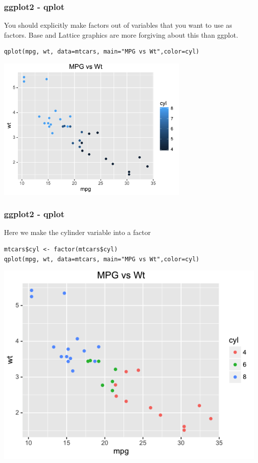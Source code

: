 \documentclass{beamer}
\begin{document}
%

\begin{frame}[fragile]
\frametitle{ggplot2 - qplot}
You should explicitly make factors out of variables that you want to use as factors. Base and Lattice graphics are more forgiving about this than ggplot.
\scriptsize
\begin{verbatim}
qplot(mpg, wt, data=mtcars, main="MPG vs Wt",color=cyl)
\end{verbatim}
\begin{center}
\includegraphics[height=7cm]{../IMG/qplot2_nofactor.png}
\end{center}
\end{frame}


%

\begin{frame}[fragile]
\frametitle{ggplot2 - qplot}
Here we make the cylinder variable into a factor
\scriptsize
\begin{verbatim}
mtcars$cyl <- factor(mtcars$cyl)
qplot(mpg, wt, data=mtcars, main="MPG vs Wt",color=cyl)
\end{verbatim}
\begin{center}
\includegraphics{../IMG/qplot_wfact.png}
\end{center}
\end{frame}
\end{document}
